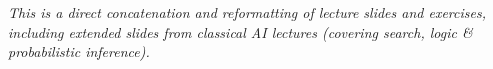 

\renewcommand{\course}{Introduction to Artificial Intelligence}
\renewcommand{\coursepicture}{course_ai}
\renewcommand{\coursedate}{Summer 2023}

\script

\usepackage{etoolbox}

\newlength\rightmargintoc
\setlength\rightmargintoc{\linewidth}
\addtolength\rightmargintoc{-7em}

\makeatletter
\def\subsubsectocline#1#2#3#4#5{%
\parshape 2 4em \rightmargintoc \dimexpr\parindent+4em\relax \rightmargintoc
\@tempdima#3
\ifdim\lastskip=1sp;\relax\ \else\fi{\footnotesize#4}\hskip1sp%
}
\renewcommand*\l@subsubsection{\subsubsectocline{1}{0em}{3em}}
\makeatother


  
\scripttitle

\emph{This is a direct concatenation and reformatting of lecture
    slides and exercises, including extended slides from classical AI lectures (covering search, logic \& probabilistic inference).}

  {\tableofcontents}



\clearpage
\slidefont
\fancyhfoffset{0mm}



